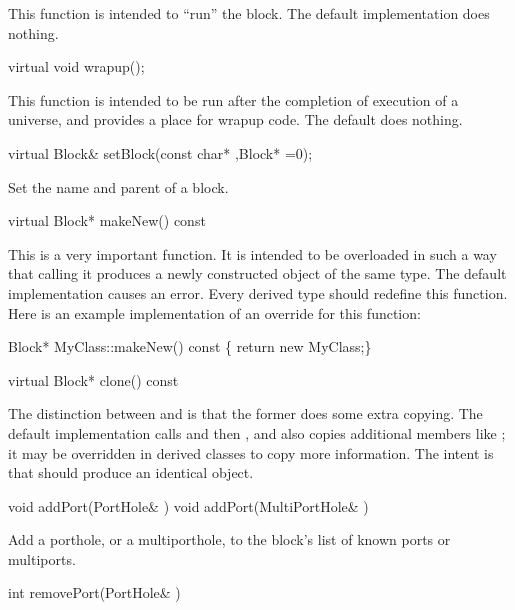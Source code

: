 This function is intended to ``run'' the block.  The default
implementation does nothing.

\begin{example}
virtual void wrapup();
\end{example}

This function is intended to be run after the completion of execution
of a universe, and provides a place for wrapup code.  The default does
nothing.

\begin{example}
virtual Block& setBlock(const char* ,Block* =0);
\end{example}

Set the name and parent of a block.

\begin{example}
virtual Block* makeNew() const
\end{example}

This is a very important function.  It is intended to be overloaded in
such a way that calling it produces a newly constructed object of the
same type.  The default implementation causes an error.  Every derived
type should redefine this function.  Here is an example implementation
of an override for this function:

\begin{example}
Block* MyClass::makeNew() const \{ return new MyClass;\}
\end{example}

\begin{example}
virtual Block* clone() const
\end{example}

The distinction between  and  is that the
former does some extra copying.  The default implementation calls
 and then ,
and also copies additional members like ;
it may be overridden in derived classes to
copy more information.  The intent is that  should produce
an identical object.

\begin{example}
void addPort(PortHole& )
void addPort(MultiPortHole& )
\end{example}

Add a porthole, or a multiporthole, to the block's list of known ports
or multiports.

\begin{example}
int removePort(PortHole& )
\end{example}

